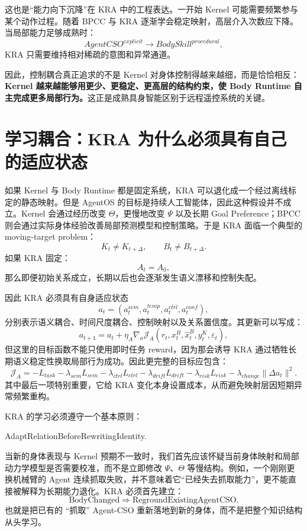 这也是``能力向下沉降''在 KRA 中的工程表达。一开始 Kernel 可能需要频繁参与某个动作过程。随着 BPCC 与 KRA 逐渐学会稳定映射，高层介入次数应下降。当局部能力足够成熟时：
\[
AgentCSO^{explicit}
\rightarrow
BodySkill^{procedural},
\]
KRA 只需要维持相对稀疏的意图和异常通道。

因此，控制耦合真正追求的不是 Kernel 对身体控制得越来越细，而是恰恰相反：\textbf{Kernel 越来越能够用更少、更稳定、更高层的结构约束，使 Body Runtime 自主完成更多局部行为。}这正是成熟具身智能区别于远程遥控系统的关键。

\section{学习耦合：KRA 为什么必须具有自己的适应状态}
\label{sec:kra-learning-coupling}

如果 Kernel 与 Body Runtime 都是固定系统，KRA 可以退化成一个经过离线标定的静态映射。但是 AgentOS 的目标是持续人工智能体，因此这种假设并不成立。Kernel 会通过经历改变 $\Theta$，更慢地改变 $\Psi$ 以及长期 Goal Preference；BPCC 则会通过实际身体经验改善局部预测模型和控制策略。于是 KRA 面临一个典型的 moving-target problem：
\[
K_t\neq K_{t+\Delta},
\qquad
B_t\neq B_{t+\Delta}.
\]
如果 KRA 固定：
\[
A_t=A_0,
\]
那么即便初始关系成立，长期以后也会逐渐发生语义漂移和控制失配。

因此 KRA 必须具有自身适应状态
\[
a_t
=
\left(
a_t^{sem},
a_t^{temp},
a_t^{ctrl},
a_t^{conf}
\right),
\]
分别表示语义耦合、时间尺度耦合、控制映射以及关系置信度。其更新可以写成：
\[
a_{t+1}
=
a_t
+
\eta_A
\nabla_a
\mathcal J_A
\left(
r_t,
x_t^B,
\hat x_t^B,
y_t^K,
\varepsilon_t
\right),
\]
但这里的目标函数不能只使用即时任务 reward，因为那会诱导 KRA 通过牺牲长期语义稳定性换取局部行为成功。因此更完整的目标应包含：
\[
\mathcal J_A
=
-L_{task}
-\lambda_{sem}L_{sem}
-\lambda_{ctrl}L_{ctrl}
-\lambda_{drift}L_{drift}
-\lambda_{risk}L_{risk}
-\lambda_{change}\|\Delta a_t\|^2.
\]
其中最后一项特别重要，它给 KRA 变化本身设置成本，从而避免映射层因短期异常频繁重构。

KRA 的学习必须遵守一个基本原则：
\begin{statementbox}
AdaptRelationBeforeRewritingIdentity.
\end{statementbox}
当新的身体表现与 Kernel 预期不一致时，我们首先应该怀疑当前身体映射和局部动力学模型是否需要校准，而不是立即修改 $\Psi$、$\Theta$ 等慢结构。例如，一个刚刚更换机械臂的 Agent 连续抓取失败，并不意味着它``已经失去抓取能力''，更不能直接被解释为长期能力退化。KRA 必须首先建立：
\[
\mathrm{BodyChanged}
\Rightarrow
\mathrm{RegroundExistingAgentCSO}.
\]
也就是把已有的 ``抓取'' Agent-CSO 重新落地到新的身体，而不是把整个知识结构从头学习。

